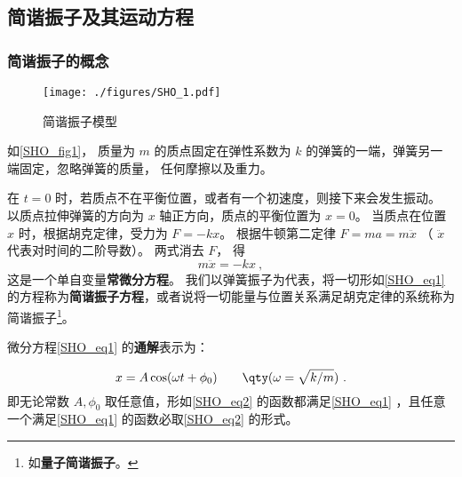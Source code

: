


\subsection{简谐振子及其运动方程}

\subsubsection{简谐振子的概念}

\begin{figure}[ht]
\centering
\texttt{[image: ./figures/SHO\_1.pdf]}
\caption{简谐振子模型} \label{SHO_fig1}
\end{figure}

如\autoref{SHO_fig1}， 质量为 $m$ 的质点固定在弹性系数为 $k$ 的弹簧的一端，弹簧另一端固定，忽略弹簧的质量， 任何摩擦以及重力。

在 $t = 0$ 时，若质点不在平衡位置，或者有一个初速度，则接下来会发生振动。 以质点拉伸弹簧的方向为 $x$ 轴正方向，质点的平衡位置为 $x = 0$。 当质点在位置 $x$ 时，根据胡克定律，受力为 $F =  - kx$。 根据牛顿第二定律 $F = ma = m\ddot x$ （ $\ddot x$ 代表对时间的二阶导数）。  两式消去 $F$， 得
\begin{equation}\label{SHO_eq1}
m\ddot x =  - kx~,
\end{equation}
这是一个单自变量\textbf{常微分方程}。 我们以弹簧振子为代表，将一切形如\autoref{SHO_eq1} 的方程称为\textbf{简谐振子方程}，或者说将一切能量与位置关系满足胡克定律的系统称为简谐振子\footnote{如\textbf{量子简谐振子}。}。




微分方程\autoref{SHO_eq1} 的\textbf{通解}表示为：

\begin{equation}\label{SHO_eq2}
x = A\cos(\omega t + \phi_0)  \qquad \qty(\omega  = \sqrt{k/m})~.
\end{equation}
即无论常数 $A, \phi_0$ 取任意值，形如\autoref{SHO_eq2} 的函数都满足\autoref{SHO_eq1} ，且任意一个满足\autoref{SHO_eq1} 的函数必取\autoref{SHO_eq2} 的形式。


